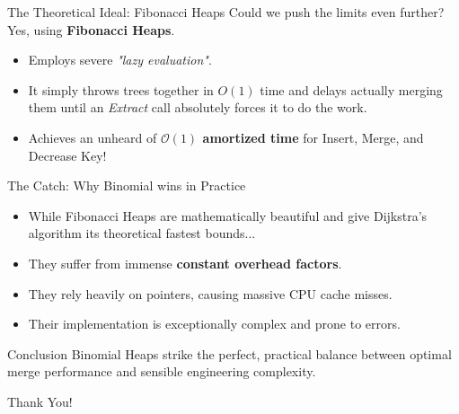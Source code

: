 \documentclass[11pt, aspectratio=169]{beamer}
\begin{document}
\begin{frame}{The Theoretical Ideal: Fibonacci Heaps}
    Could we push the limits even further? Yes, using \textbf{Fibonacci Heaps}.
    \vspace{0.3cm}
    \begin{itemize}
        \item Employs severe \textit{"lazy evaluation"}.
        \item It simply throws trees together in $O(1)$ time and delays actually merging them until an \textit{Extract} call absolutely forces it to do the work.
        \item Achieves an unheard of \textbf{$\mathcal{O}(1)$ amortized time} for Insert, Merge, and Decrease Key!
    \end{itemize}
\end{frame}

\begin{frame}{The Catch: Why Binomial wins in Practice}
    \begin{itemize}
        \item While Fibonacci Heaps are mathematically beautiful and give Dijkstra's algorithm its theoretical fastest bounds...
        \item They suffer from immense \textbf{constant overhead factors}.
        \item They rely heavily on pointers, causing massive CPU cache misses.
        \item Their implementation is exceptionally complex and prone to errors.
    \end{itemize}
    \vspace*{-0.2cm}
    \begin{alertblock}{Conclusion}
        Binomial Heaps strike the perfect, practical balance between optimal merge performance and sensible engineering complexity.
    \end{alertblock}
\end{frame}

\begin{frame}[standout]
    Thank You! \\
\end{frame}
\end{document}
